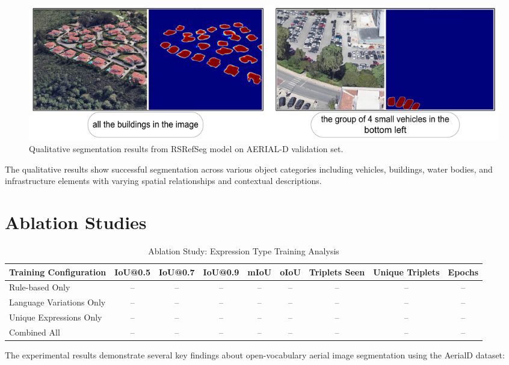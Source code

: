 \begin{figure}[H]
\centering
\includegraphics[width=\textwidth]{./Images/qualitative.png}
\caption{Qualitative segmentation results from RSRefSeg model on AERIAL-D validation set.}
\label{fig:qualitative_examples}
\end{figure}

The qualitative results show successful segmentation across various object categories including vehicles, buildings, water bodies, and infrastructure elements with varying spatial relationships and contextual descriptions.

\section{Ablation Studies}

\begin{table}[H]
\centering
\caption{Ablation Study: Expression Type Training Analysis}
\label{tab:ablation_expression_types}
{\footnotesize
\begin{tabular}{@{}p{3.2cm}cccccccc@{}}
\toprule
\textbf{Training Configuration} & \textbf{IoU@0.5} & \textbf{IoU@0.7} & \textbf{IoU@0.9} & \textbf{mIoU} & \textbf{oIoU} & \textbf{Triplets Seen} & \textbf{Unique Triplets} & \textbf{Epochs} \\
\midrule
Rule-based Only & -- & -- & -- & -- & -- & -- & -- & -- \\
Language Variations Only & -- & -- & -- & -- & -- & -- & -- & -- \\
Unique Expressions Only & -- & -- & -- & -- & -- & -- & -- & -- \\
Combined All & -- & -- & -- & -- & -- & -- & -- & -- \\
\bottomrule
\end{tabular}%
}
\end{table}

The experimental results demonstrate several key findings about open-vocabulary aerial image segmentation using the AerialD dataset:

